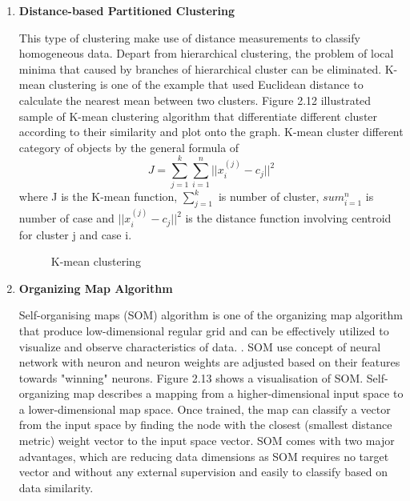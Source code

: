 \documentclass[twoside]{utmthesis}
\begin{document}
\begin{enumerate}
\item \textbf{Distance-based Partitioned Clustering}


This type of clustering make use of distance measurements to classify homogeneous data. Depart from hierarchical clustering, the problem of local minima that caused by branches of hierarchical cluster can be eliminated. K-mean clustering is one of the example that used Euclidean distance to calculate the nearest mean between two clusters. Figure 2.12 illustrated sample of K-mean clustering algorithm that differentiate different cluster according to their similarity and plot onto the graph. K-mean cluster different category of objects by the general formula of 
\begin{equation}\label{2.3}
	J = \sum_{j=1}^k\sum_{i=1}^n || x_i^{(j)} - c_j ||^2
\end{equation}
where J is the K-mean function, $\sum_{j=1}^k$ is number of cluster, $sum_{i=1}^n$ is number of case and $|| x_i^{(j)} - c_j ||^2$ is the distance function involving centroid for cluster j and case i.
\begin{figure}[H]
\centering
{}
\caption{K-mean clustering}
\end{figure}
\vspace{-1cm}
\item \textbf{Organizing Map Algorithm}

Self-organising maps (SOM) algorithm is one of the organizing map algorithm that produce low-dimensional regular grid and can be effectively utilized to visualize and observe characteristics of data. \citep{vesanto2000clustering}. SOM use concept of neural network with neuron and neuron weights are adjusted based on their features towards "winning" neurons. Figure 2.13 shows a visualisation of SOM. Self-organizing map describes a mapping from a higher-dimensional input space to a lower-dimensional map space. Once trained, the map can classify a vector from the input space by finding the node with the closest (smallest distance metric) weight vector to the input space vector. SOM comes with two major advantages, which are reducing data dimensions as SOM requires no target vector and without any external supervision and easily to classify based on data similarity. \citep{jaewookahnsueyeonsyn2005}


\end{enumerate}
\end{document}

